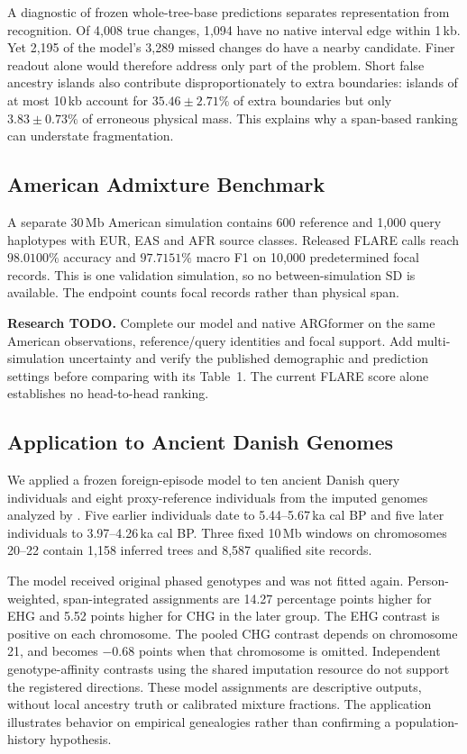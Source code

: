 \documentclass[letterpaper]{article}
\newcommand{\todo}[1]{\par\noindent\textbf{Research TODO.} #1\par}
\begin{document}
A diagnostic of frozen whole-tree-base predictions separates representation from recognition. Of 4,008 true changes, 1,094 have no native interval edge within 1\,kb. Yet 2,195 of the model's 3,289 missed changes do have a nearby candidate. Finer readout alone would therefore address only part of the problem. Short false ancestry islands also contribute disproportionately to extra boundaries: islands of at most 10\,kb account for $35.46\pm2.71\%$ of extra boundaries but only $3.83\pm0.73\%$ of erroneous physical mass. This explains why a span-based ranking can understate fragmentation.

\subsection{American Admixture Benchmark}
A separate 30\,Mb American simulation contains 600 reference and 1,000 query haplotypes with EUR, EAS and AFR source classes. Released FLARE calls reach $98.0100\%$ accuracy and $97.7151\%$ macro F1 on 10,000 predetermined focal records. This is one validation simulation, so no between-simulation SD is available. The endpoint counts focal records rather than physical span.

\todo{Complete our model and native ARGformer on the same American observations, reference/query identities and focal support. Add multi-simulation uncertainty and verify the published demographic and prediction settings before comparing with its Table~1. The current FLARE score alone establishes no head-to-head ranking.}

\subsection{Application to Ancient Danish Genomes}
We applied a frozen foreign-episode model to ten ancient Danish query individuals and eight proxy-reference individuals from the imputed genomes analyzed by \citet{eurasians2024}. Five earlier individuals date to 5.44--5.67\,ka cal BP and five later individuals to 3.97--4.26\,ka cal BP. Three fixed 10\,Mb windows on chromosomes 20--22 contain 1,158 inferred trees and 8,587 qualified site records.

The model received original phased genotypes and was not fitted again. Person-weighted, span-integrated assignments are 14.27 percentage points higher for EHG and 5.52 points higher for CHG in the later group. The EHG contrast is positive on each chromosome. The pooled CHG contrast depends on chromosome 21, and becomes $-0.68$ points when that chromosome is omitted. Independent genotype-affinity contrasts using the shared imputation resource do not support the registered directions. These model assignments are descriptive outputs, without local ancestry truth or calibrated mixture fractions. The application illustrates behavior on empirical genealogies rather than confirming a population-history hypothesis.
\end{document}
